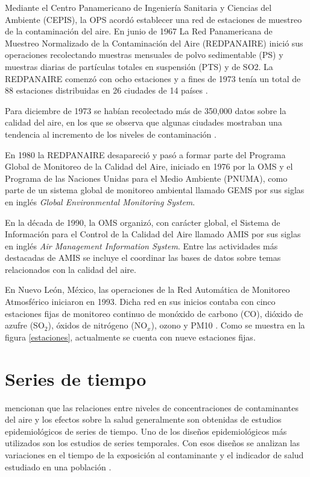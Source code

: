 Mediante el Centro Panamericano de Ingeniería Sanitaria y Ciencias del Ambiente (CEPIS), la OPS acordó establecer una red de estaciones de muestreo de la contaminación del aire.
En junio de 1967 La Red Panamericana de Muestreo Normalizado de la Contaminación del Aire (REDPANAIRE) inició sus operaciones recolectando muestras mensuales de polvo sedimentable (PS) y muestras diarias de partículas totales en suspensión (PTS) y de SO2. La REDPANAIRE comenzó con ocho estaciones y a fines de 1973 tenía un total de 88 estaciones distribuidas en 26 ciudades de 14 países \citep{r5}.

Para diciembre de 1973 se habían recolectado más de 350,000 datos sobre la calidad del aire, en los que se observa que algunas ciudades mostraban una tendencia al incremento de los niveles de contaminación \citep{r5}.

En 1980 la REDPANAIRE desapareció y pasó a formar parte del Programa Global de Monitoreo de la Calidad del Aire, iniciado en 1976 por la OMS y el Programa de las Naciones Unidas para el Medio Ambiente (PNUMA), como parte de un sistema global de monitoreo ambiental llamado GEMS por sus siglas en inglés \emph{Global Environmental Monitoring System}.

En la década de 1990, la OMS organizó, con carácter global, el Sistema de Información para el Control de la Calidad del Aire llamado AMIS por sus siglas en inglés \emph{Air Management Information System}. Entre las actividades más destacadas de AMIS se incluye el coordinar las bases de datos sobre temas relacionados con la calidad del aire.

En Nuevo León, México, las operaciones de la Red Automática de Monitoreo Atmosférico iniciaron en 1993. Dicha red en sus inicios contaba con cinco estaciones fijas de monitoreo continuo de monóxido de carbono (CO), dióxido de azufre (SO$_2$), óxidos de nitrógeno (NO$_x$), ozono y PM10 \citep{r4}. Como se muestra en la figura \ref{estaciones}, actualmente se cuenta con nueve estaciones fijas.

\section{Series de tiempo}
\citet{r4} mencionan que las relaciones entre niveles de concentraciones de contaminantes del aire y los efectos sobre la salud generalmente son obtenidas de estudios epidemiológicos de series de tiempo. Uno de los diseños epidemiológicos más utilizados son los estudios de series temporales. Con esos diseños se analizan las variaciones en el tiempo de la exposición al contaminante y el indicador de salud estudiado en una población \citep{r1}.

